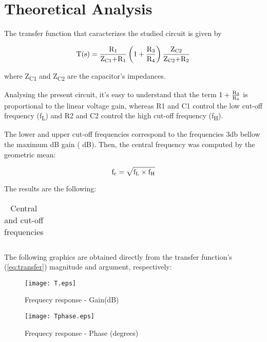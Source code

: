 \section{Theoretical Analysis} \label{sec:analysis}
 
The transfer function that caracterizes the studied circuit is given by

\begin{equation} \label{eq:transfer}
 \text{T(s)}=\frac{\text{R\textsubscript1}}{\text{Z\textsubscript{C1}+R\textsubscript1}} \left( 1+\frac{\text{R\textsubscript3}}{\text{R\textsubscript4}}\right) \frac{\text{Z\textsubscript{C2}}}{\text{Z\textsubscript{C2}+R\textsubscript2}}
\end{equation}

where Z\textsubscript{C1} and Z\textsubscript{C2} are the capacitor's impedances.

Analysing the present circuit, it's easy to understand that the term $ 1+\frac{\text{R\textsubscript3}}{\text{R\textsubscript4}}$ is proportional to the linear voltage gain, whereas R1 and C1 control the low cut-off frequency (f\textsubscript{L}) and R2 and C2 control the high cut-off frequency (f\textsubscript{H}).

The lower and upper cut-off frequencies correspond to the frequencies 3db bellow the maximum dB gain ( dB). Then, the central frequency was computed by the geometric mean:

\begin{equation}
 \text{f\textsubscript{c}}= \sqrt{\text{f\textsubscript{L}} \times \text{f\textsubscript{H}}}
\end{equation}

The results are the following:

\begin{table}[!htb]
\centering
  \begin{tabular}{|c | c|}
    \hline    
    
 \end{tabular}
 \caption{Central and cut-off frequencies}\label{tab:theo:frequencies}
\end{table}

The following graphics are obtained directly from the transfer function's (\ref{eq:transfer}) magnitude and argument, respectively:


\begin{figure}[h] \centering
  \begin{minipage}{.45\textwidth}
    \texttt{[image: T.eps]}
    \caption{Frequecy response - Gain(dB)}\label{fig:theo:gain}
  \end{minipage}%
    \hspace{2 mm}
  \begin{minipage}{.45\textwidth}
  \centering
    \texttt{[image: Tphase.eps]}
    \caption{Frequecy response - Phase (degrees)}\label{fig:theo:phase}
      \end{minipage}
\end{figure}

